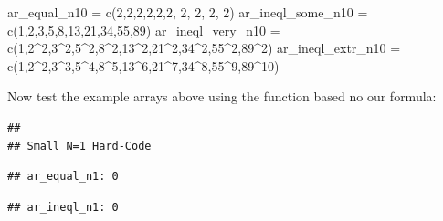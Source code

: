 \documentclass[
]{book}
\newenvironment{Shaded}{\begin{snugshade}}{\end{snugshade}}
\newcommand{\DecValTok}[1]{\textcolor[rgb]{0.00,0.00,0.81}{#1}}
\newcommand{\FunctionTok}[1]{\textcolor[rgb]{0.00,0.00,0.00}{#1}}
\newcommand{\NormalTok}[1]{#1}
\newcommand{\OtherTok}[1]{\textcolor[rgb]{0.56,0.35,0.01}{#1}}
\newcommand{\SpecialCharTok}[1]{\textcolor[rgb]{0.00,0.00,0.00}{#1}}
\begin{document}
\begin{Shaded}
\begin{Highlighting}[]
\NormalTok{ar\_equal\_n10 }\OtherTok{=} \FunctionTok{c}\NormalTok{(}\DecValTok{2}\NormalTok{,}\DecValTok{2}\NormalTok{,}\DecValTok{2}\NormalTok{,}\DecValTok{2}\NormalTok{,}\DecValTok{2}\NormalTok{,}\DecValTok{2}\NormalTok{, }\DecValTok{2}\NormalTok{, }\DecValTok{2}\NormalTok{, }\DecValTok{2}\NormalTok{, }\DecValTok{2}\NormalTok{)}
\NormalTok{ar\_ineql\_some\_n10 }\OtherTok{=} \FunctionTok{c}\NormalTok{(}\DecValTok{1}\NormalTok{,}\DecValTok{2}\NormalTok{,}\DecValTok{3}\NormalTok{,}\DecValTok{5}\NormalTok{,}\DecValTok{8}\NormalTok{,}\DecValTok{13}\NormalTok{,}\DecValTok{21}\NormalTok{,}\DecValTok{34}\NormalTok{,}\DecValTok{55}\NormalTok{,}\DecValTok{89}\NormalTok{)}
\NormalTok{ar\_ineql\_very\_n10 }\OtherTok{=} \FunctionTok{c}\NormalTok{(}\DecValTok{1}\NormalTok{,}\DecValTok{2}\SpecialCharTok{\^{}}\DecValTok{2}\NormalTok{,}\DecValTok{3}\SpecialCharTok{\^{}}\DecValTok{2}\NormalTok{,}\DecValTok{5}\SpecialCharTok{\^{}}\DecValTok{2}\NormalTok{,}\DecValTok{8}\SpecialCharTok{\^{}}\DecValTok{2}\NormalTok{,}\DecValTok{13}\SpecialCharTok{\^{}}\DecValTok{2}\NormalTok{,}\DecValTok{21}\SpecialCharTok{\^{}}\DecValTok{2}\NormalTok{,}\DecValTok{34}\SpecialCharTok{\^{}}\DecValTok{2}\NormalTok{,}\DecValTok{55}\SpecialCharTok{\^{}}\DecValTok{2}\NormalTok{,}\DecValTok{89}\SpecialCharTok{\^{}}\DecValTok{2}\NormalTok{)}
\NormalTok{ar\_ineql\_extr\_n10 }\OtherTok{=} \FunctionTok{c}\NormalTok{(}\DecValTok{1}\NormalTok{,}\DecValTok{2}\SpecialCharTok{\^{}}\DecValTok{2}\NormalTok{,}\DecValTok{3}\SpecialCharTok{\^{}}\DecValTok{3}\NormalTok{,}\DecValTok{5}\SpecialCharTok{\^{}}\DecValTok{4}\NormalTok{,}\DecValTok{8}\SpecialCharTok{\^{}}\DecValTok{5}\NormalTok{,}\DecValTok{13}\SpecialCharTok{\^{}}\DecValTok{6}\NormalTok{,}\DecValTok{21}\SpecialCharTok{\^{}}\DecValTok{7}\NormalTok{,}\DecValTok{34}\SpecialCharTok{\^{}}\DecValTok{8}\NormalTok{,}\DecValTok{55}\SpecialCharTok{\^{}}\DecValTok{9}\NormalTok{,}\DecValTok{89}\SpecialCharTok{\^{}}\DecValTok{10}\NormalTok{)}
\end{Highlighting}
\end{Shaded}

Now test the example arrays above using the function based no our formula:

\begin{verbatim}
## 
## Small N=1 Hard-Code
\end{verbatim}

\begin{verbatim}
## ar_equal_n1: 0
\end{verbatim}

\begin{verbatim}
## ar_ineql_n1: 0
\end{verbatim}
\end{document}
